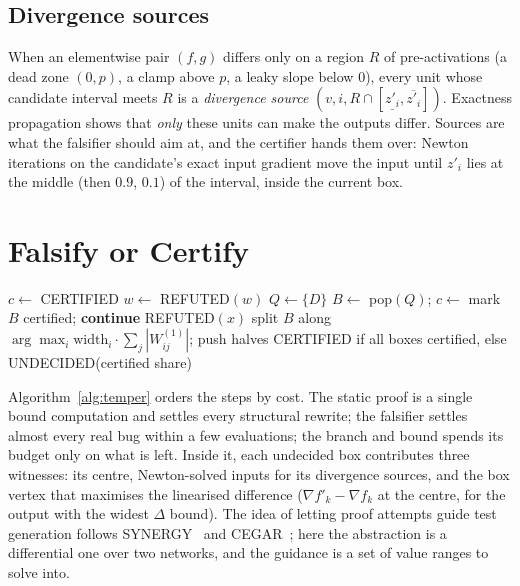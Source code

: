 \documentclass[conference]{IEEEtran}
\begin{document}
\subsection{Divergence sources}\label{sec:sources}
When an elementwise pair $(f,g)$ differs only on a region $R$ of pre-activations (a dead zone $(0,p)$, a clamp above $p$, a leaky slope below $0$), every unit whose candidate interval meets $R$ is a \emph{divergence source} $(v,i,R\cap[\underline{z'_i},\overline{z'_i}])$. Exactness propagation shows that \emph{only} these units can make the outputs differ. Sources are what the falsifier should aim at, and the certifier hands them over: Newton iterations on the candidate's exact input gradient move the input until $z'_i$ lies at the middle (then $0.9$, $0.1$) of the interval, inside the current box.

\section{Falsify or Certify}\label{sec:loop}
\begin{algorithm}[t]
\caption{Temper decision for $f\to f'$ on domain $D$}
\label{alg:temper}
\begin{algorithmic}[1]
\State $c\gets$  
 \Return CERTIFIED \EndIf
\State $w\gets$ 
 \Return REFUTED$(w)$ \EndIf
\State $Q\gets\{D\}$ 
  \State $B\gets$ pop$(Q)$; $c\gets$ 
   \State mark $B$ certified; \textbf{continue} \EndIf
     \Return REFUTED$(x)$ \EndIf
  \EndFor
  \State split $B$ along $\arg\max_i \mathrm{width}_i\cdot\sum_j|W^{(1)}_{ij}|$; push halves
\EndWhile
\State \Return CERTIFIED if all boxes certified, else UNDECIDED(certified share)
\end{algorithmic}
\end{algorithm}
Algorithm~\ref{alg:temper} orders the steps by cost. The static proof is a single bound computation and settles every structural rewrite; the falsifier settles almost every real bug within a few evaluations; the branch and bound spends its budget only on what is left. Inside it, each undecided box contributes three witnesses: its centre, Newton-solved inputs for its divergence sources, and the box vertex that maximises the linearised difference ($\nabla f'_k-\nabla f_k$ at the centre, for the output with the widest $\Delta$ bound). The idea of letting proof attempts guide test generation follows SYNERGY~\cite{synergy} and CEGAR~\cite{cegar}; here the abstraction is a differential one over two networks, and the guidance is a set of value ranges to solve into.
\end{document}

